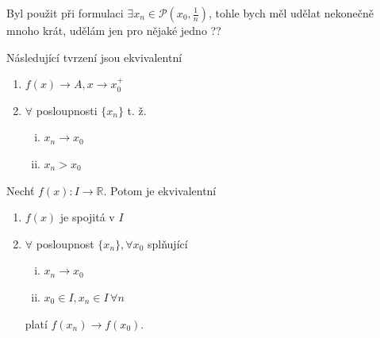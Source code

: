 \begin{poznamka}
  Byl použit při formulaci $\exists x_n \in \mathscr P(x_0, \frac{1}{n})$, tohle bych měl udělat nekonečně mnoho krát, udělám jen pro nějaké jedno ??
\end{poznamka}

\begin{poznamka}
  Následující tvrzení jsou ekvivalentní
  \begin{enumerate}[1.]
    \item $f(x) \to A, x \to x_0^+$
    \item $\forall$ posloupnosti $\{x_n\}$ t. ž. \begin{enumerate}[i.]
      \item $x_n \to x_0$
      \item $x_n > x_0$
    \end{enumerate}
  \end{enumerate}
\end{poznamka}

\begin{veta}
  Nechť $f(x): I \to \mathbb R$. Potom je ekvivalentní
  \begin{enumerate}[1.]
    \item $f(x)$ je spojitá v $I$
    \item $\forall$ posloupnost $\{x_n\}, \forall x_0$ splňující \begin{enumerate}[i.]
      \item $x_n \to x_0$
      \item $x_0 \in I, x_n \in I \,\forall n$
    \end{enumerate}
    platí $f(x_n) \to f(x_0)$.
  \end{enumerate}
\end{veta}

